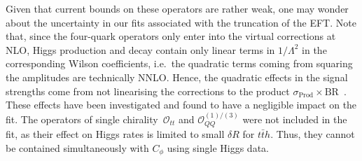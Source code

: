 	Given that current bounds on these operators are rather weak, one may wonder about the uncertainty in our fits associated with the truncation of the EFT.
	Note that, since the four-quark operators only enter into the virtual corrections at NLO, Higgs production and decay contain only linear terms in $1/\Lambda^{2}$ in the corresponding Wilson coefficients, i.e.~the quadratic terms coming from squaring the amplitudes are technically NNLO. 
	Hence, the quadratic effects in the signal strengths come from not linearising the corrections to the product $\sigma_\mathrm{ Prod} \times \mathrm{ BR}$~\!.  These effects have been investigated and found to have a negligible impact on the fit. 
	The operators of single chirality~$\mathcal O_{tt}$ and $\mathcal{O}_{QQ}^{(1)/(3)}$ were not included in the fit, as their effect on Higgs rates is limited to small $\delta R$ for $t\bar t h$. Thus, they cannot be contained simultaneously with $C_\phi$ using single Higgs data.  
